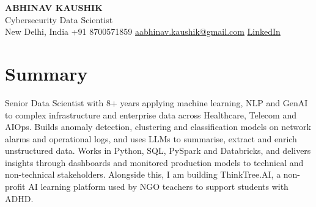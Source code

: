 \documentclass[10pt,a4paper]{article}
\begin{document}
\begin{center}
  {\LARGE\bfseries ABHINAV KAUSHIK}\\[2pt]
  {\large Cybersecurity Data Scientist}\\[2pt]
  New Delhi, India \textbar{} +91 8700571859 \textbar{} \href{mailto:aabhinav.kaushik@gmail.com}{aabhinav.kaushik@gmail.com} \textbar{} \href{https://www.linkedin.com/in/abhinav-kaushik10/}{LinkedIn}  
\end{center}

\section{Summary}
Senior Data Scientist with 8+ years applying machine learning, NLP and GenAI to complex infrastructure and enterprise data across Healthcare, Telecom and AIOps. Builds anomaly detection, clustering and classification models on network alarms and operational logs, and uses LLMs to summarise, extract and enrich unstructured data. Works in Python, SQL, PySpark and Databricks, and delivers insights through dashboards and monitored production models to technical and non-technical stakeholders. Alongside this, I am building ThinkTree.AI, a non-profit AI learning platform used by NGO teachers to support students with ADHD.
\end{document}
